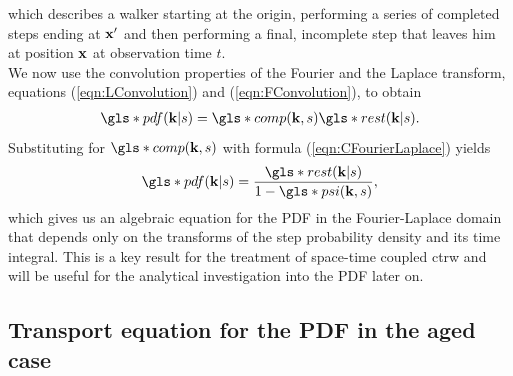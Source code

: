 %
which describes a walker starting at the origin, performing a series of completed steps ending at $\mathbf{ x' }$ and then performing a final, incomplete step that leaves him at position $\mathbf{ x }$ at observation time $t$.\\
We now use the convolution properties of the Fourier and the Laplace transform, equations (\ref{eqn:LConvolution}) and (\ref{eqn:FConvolution}), to obtain 
%
\begin{align}
\gls*{pdf}(\ve{k}|s) = \gls*{comp}(\ve{k},s) \gls*{rest}(\ve{k}|s) \label{eqn:pdfFourierLaplaceI} .
\end{align}
%
Substituting for $\gls*{comp}(\ve{k},s)$ with formula (\ref{eqn:CFourierLaplace}) yields
%
\begin{align}
\gls*{pdf}(\ve{k}|s) = \frac{ \gls*{rest}(\ve{k}|s)}{1 - \gls*{psi}(\ve{k},s)} \label{eqn:pdfFourierLaplaceII} ,
\end{align}
%
which gives us an algebraic equation for the \gls*{PDF} in the Fourier-Laplace domain that depends only on the transforms of the step probability density and its time integral. This is a key result for the treatment of space-time coupled \gls*{ctrw} and will be useful for the analytical investigation into the \gls*{PDF} later on.


\subsection{Transport equation for the PDF in the aged case}

